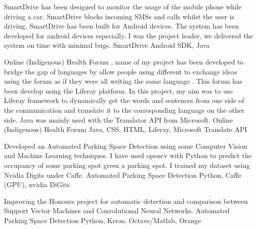 \documentclass[]{awesome-cv}
\begin{document}
\vspace{-7mm}
\begin{cventries}
	\cventry
	{SmartDrive has been designed to monitor the usage of the mobile phone while driving a car. SmartDrive blocks incoming SMSs and calls whilst the user is driving. SmartDrive has been built for Android devices. The system has been developed for android devices especially. I was the project leader, we delivered the system on time with minimal bugs.}
	{SmartDrive}
	{Android SDK, Java}
	{}
	{}
	
	\vspace{-5mm}
	\cventry
	{Online (Indigenous) Health Forum , name of my project has been developed to bridge the gap of languages by allow people using different to exchange ideas using the forum as if they were all writing the same language . This forum has been develop using the Liferay platform. In this project, my aim was to use Liferay framework to dynamically get the words and sentences from one side of the communication and translate it to the corresponding language on the other side. Java was mainly used with the Translator API from Microsoft.}
	{Online (Indigenous) Health Forum}
	{Java, CSS, HTML, Liferay, Microsoft Translate API}
	{}
	{}
	
	\vspace{-5mm}
	\cventry
	{Developed an Automated Parking Space Detection using some Computer Vision and Machine Learning techniques. I have used opencv with Python to predict the occupancy of some parking spot given a parking spot. I trained my dataset using Nvidia Digits under Caffe.}
	{Automated Parking Space Detection}
	{Python, Caffe (GPU), nvidia DiGits}
	{}
	{}
	
	\vspace{-5mm}
	\cventry
	{Improving the Honours project for automatic detection and comparison between Support Vector Machines and Convolutional Neural Networks.}
	{Automated Parking Space Detection}
	{Python, Keras, Octave/Matlab, Orange}
	{}
	{}
	
	\vspace{-5mm}
\end{cventries}
\end{document}

